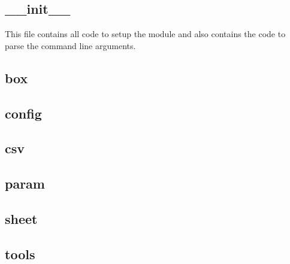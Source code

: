 \documentclass[12pt]{article}
\begin{document}
\subsection{\_\_init\_\_}
This file contains all code to setup the module and also contains the code to parse the command line arguments.

\subsection{box}
\subsection{config}
\subsection{csv}
\subsection{param}
\subsection{sheet}
\subsection{tools}
\end{document}
